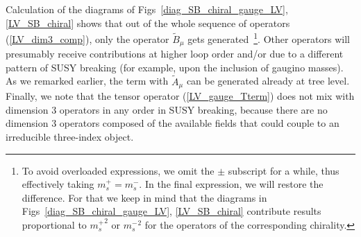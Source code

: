 \documentclass[12pt]{revtex4}
\begin{document}
	Calculation of the diagrams of Figs~\ref{diag_SB_chiral_gauge_LV}, \ref{LV_SB_chiral}
	shows that out of the whole sequence of operators (\ref{LV_dim3_comp}),
	only the operator $ \widetilde{B}_\mu $ gets generated\
\footnote{
	To avoid overloaded expressions, we omit the $ \pm $ subscript for a while,
	thus effectively taking $ m_s^+ = m_s^- $. 
	In the final expression, we will restore the difference.
	For that we keep in mind that the diagrams in 
	Figs~\ref{diag_SB_chiral_gauge_LV}, \ref{LV_SB_chiral}
	contribute results proportional to $ {m_s^+}^2 $ or $ {m_s^-}^2 $ for 
	the operators of the corresponding chirality.
	}.
	Other operators will presumably receive contributions at higher loop order
	and/or due to a different pattern of SUSY breaking (for example, upon the
	inclusion of gaugino masses).
	As we remarked earlier, the term with $ \widetilde{A}_\mu $ can be 
	generated already at tree level. 
	Finally, we note that the tensor operator (\ref{LV_gauge_Tterm}) does not
	mix with dimension 3 operators in any order in SUSY breaking, because there
	are no dimension 3 operators composed of the available fields that could
	couple to an irreducible three-index object.
\end{document}
